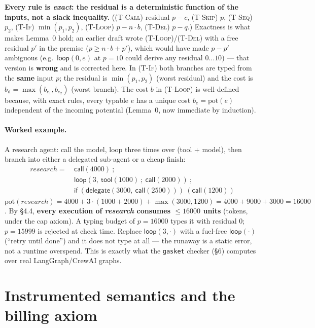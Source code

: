 \documentclass[11pt]{article}
\theoremstyle{plain}
\newcommand{\kw}[1]{\mathsf{#1}}                      %
\newcommand{\pot}{\mathrm{pot}}
\newcommand{\rul}[1]{\textsc{(#1)}}
\begin{document}
\medskip
\noindent\textbf{Every rule is \emph{exact}: the residual is a deterministic function of the
inputs, not a slack inequality.} (\rul{T-Call} residual $p - c$, \rul{T-Skip} $p$, \rul{T-Seq}
$p_2$, \rul{T-If} $\min(p_1, p_2)$, \rul{T-Loop} $p - n \cdot b$, \rul{T-Del} $p - q$.) Exactness
is what makes Lemma~0 hold; an earlier draft wrote \rul{T-Loop}/\rul{T-Del} with a free residual
$p'$ in the premise ($p \ge n \cdot b + p'$), which would have made $p - p'$ ambiguous (e.g.\
$\kw{loop}(0, e)$ at $p = 10$ could derive any residual $0 \dots 10$) --- that version is
\textbf{wrong} and is corrected here. In \rul{T-If} both branches are typed from the \textbf{same}
input $p$; the residual is $\min(p_1, p_2)$ (worst residual) and the cost is
$b_{\mathrm{if}} = \max(b_{e_1}, b_{e_2})$ (worst branch). The cost $b$ in \rul{T-Loop} is
well-defined because, with exact rules, every typable $e$ has a unique cost $b_e = \pot(e)$
independent of the incoming potential (Lemma~0, now immediate by induction).

\paragraph{Worked example.}
A research agent: call the model, loop three times over (tool + model), then branch into either a
delegated sub-agent or a cheap finish:
\[
\begin{aligned}
\mathit{research} =\ & \kw{call}(4000)\ ; \\
                     & \kw{loop}(3,\ \kw{tool}(1000)\ ;\ \kw{call}(2000))\ ; \\
                     & \kw{if}\ (\kw{delegate}(3000,\ \kw{call}(2500)))\ (\kw{call}(1200))
\end{aligned}
\]
$\pot(\mathit{research}) = 4000 + 3 \cdot (1000 + 2000) + \max(3000, 1200) = 4000 + 9000 + 3000 =
16000$. By \S4.4, \textbf{every execution of \emph{research} consumes $\le 16000$ units} (tokens,
under the cap axiom). A typing budget of $p = 16000$ types it with residual $0$; $p = 15999$ is
rejected at check time. Replace $\kw{loop}(3, \cdot)$ with a fuel-free $\kw{loop}(\cdot)$ (``retry
until done'') and it does not type at all --- the runaway is a static error, not a runtime
overspend. This is exactly what the \texttt{gasket} checker (\S6) computes over real
LangGraph/CrewAI graphs.

\section{Instrumented semantics and the billing axiom}
\end{document}
